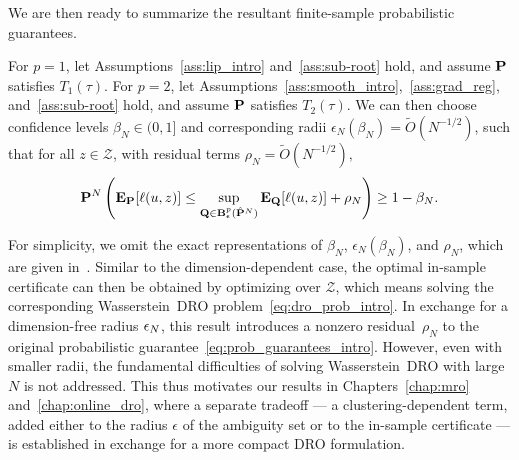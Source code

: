 We are then ready to summarize the resultant finite-sample probabilistic guarantees.
\begin{theorem}
\label{thm:informal_curse} 
For $p=1$, let Assumptions~\ref{ass:lip_intro} and~\ref{ass:sub-root} hold, and assume ${\mathbf P}$ satisfies $T_1(\tau)$. For $p=2$, let Assumptions~\ref{ass:smooth_intro},~\ref{ass:grad_reg}, and~\ref{ass:sub-root} hold, and assume ${\mathbf P}$ satisfies $T_2(\tau)$. We can then choose confidence levels $\beta_N \in (0,1]$ and corresponding radii $\epsilon_N(\beta_N)=\tilde{O}(N^{-1/2})$, such that for all $z \in \mathcal{Z}$, with residual terms $\rho_{N} = \tilde{O}(N^{-1/2}),$ 
\begin{equation}
	\label{eq:informal_x}
	{\mathbf P}^{N}\left(\mathbf{E}_{{\mathbf P}}[\ell(u, z)] \le \sup_{\mathbf{Q} \in  \mathbf{B}_{{\epsilon}}^{p}(\hat{{\mathbf P}}^N)}\mathbf{E}_{ \mathbf{Q}}[\ell(u,z)]+ \rho_{N}\right) \ge 1 - \beta_{N}.
\end{equation}
\end{theorem}
For simplicity, we omit the exact representations of $\beta_N$, $\epsilon_N(\beta_N)$, and $\rho_N$, which are given in~\cite[Corollary 4, Corollary 6]{gao2016distributionally}.
Similar to the dimension-dependent case, the optimal in-sample certificate can then be obtained by optimizing over $\mathcal{Z}$, which means solving the corresponding Wasserstein~\gls{DRO} problem~\eqref{eq:dro_prob_intro}. 
In exchange for a dimension-free radius $\epsilon_N$, this result introduces a nonzero residual~$\rho_N$ to the original probabilistic guarantee~\eqref{eq:prob_guarantees_intro}. However, even with smaller radii, the fundamental difficulties of solving Wasserstein~\gls{DRO} with large $N$ is not addressed. This thus motivates our results in Chapters~\ref{chap:mro} and~\ref{chap:online_dro}, where a separate tradeoff --- a clustering-dependent term, added either to the radius $\epsilon$ of the ambiguity set or to the in-sample certificate ---  is established in exchange for a more compact \gls{DRO} formulation.

